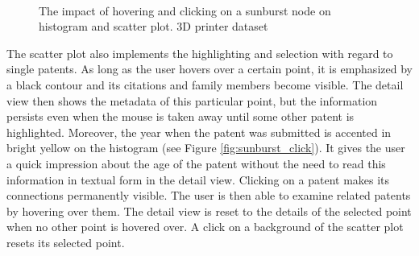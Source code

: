 \begin{figure}[!]
    \centering
    \\
    \caption{The impact of hovering and clicking on a sunburst node on histogram and scatter plot. 3D printer dataset}
    \label{fig:sunburst_interactions}
\end{figure}

The scatter plot also implements the highlighting and selection with regard to single patents.
As long as the user hovers over a certain point, it is emphasized by a black contour and its citations and family members become visible.
The detail view then shows the metadata of this particular point, but the information persists even when the mouse is taken away until some other patent is highlighted.
Moreover, the year when the patent was submitted is accented in bright yellow on the histogram (see Figure \autoref{fig:sunburst_click}).
It gives the user a quick impression about the age of the patent without the need to read this information in textual form in the detail view.
Clicking on a patent makes its connections permanently visible.
The user is then able to examine related patents by hovering over them.
The detail view is reset to the details of the selected point when no other point is hovered over.
A click on a background of the scatter plot resets its selected point.

